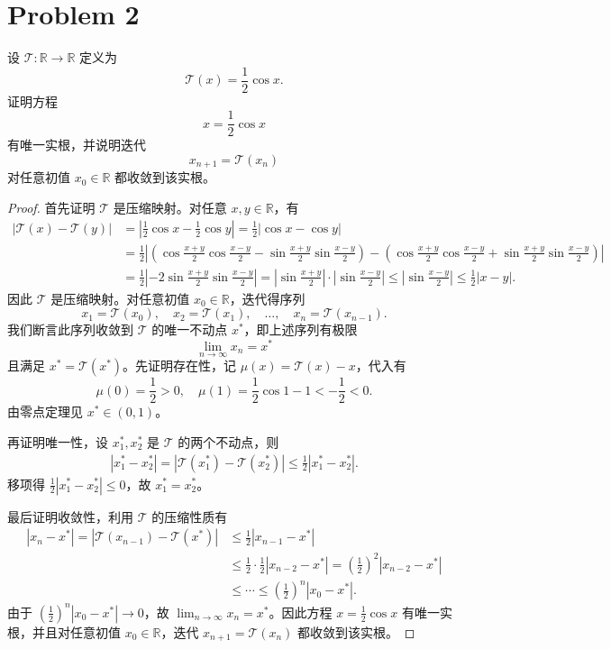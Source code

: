 \section*{Problem 2}

设 $\mathcal{T} : \mathbb{R} \to \mathbb{R}$ 定义为
\[
\mathcal{T}(x) = \frac12 \cos x.
\]
证明方程
\[
x = \frac12 \cos x
\]
有唯一实根，并说明迭代
\[
x_{n+1} = \mathcal{T}(x_n)
\]
对任意初值 $x_0 \in \mathbb{R}$ 都收敛到该实根。

\begin{proof}
首先证明 $\mathcal{T}$ 是压缩映射。对任意 $x, y \in \mathbb{R}$，有
\[
\begin{aligned}
|\mathcal{T}(x) - \mathcal{T}(y)| &= \left|\frac12 \cos x - \frac12 \cos y\right| = \frac12 |\cos x - \cos y| \\
&= \frac12 \left| {\left(\cos \frac{x + y}{2} \cos \frac{x - y}{2} - \sin \frac{x + y}{2} \sin \frac{x - y}{2}\right)- \left(\cos \frac{x + y}{2} \cos \frac{x - y}{2} + \sin \frac{x + y}{2} \sin \frac{x - y}{2}\right)}\right| \\
&= \frac12 \left| -2 \sin \frac{x + y}{2} \sin \frac{x - y}{2} \right| = \left|\sin \frac{x + y}{2}\right| \cdot \left|\sin \frac{x - y}{2}\right| \leq \left|\sin \frac{x - y}{2}\right| \leq \frac12 \left|x - y\right|.
\end{aligned}
\]
因此 $\mathcal{T}$ 是压缩映射。对任意初值 $x_0 \in \mathbb{R}$，迭代得序列
\[
x_1 = \mathcal{T}(x_0),\quad x_2 = \mathcal{T}(x_1),\quad \ldots, \quad x_n = \mathcal{T}(x_{n-1}).
\]
我们断言此序列收敛到 $\mathcal{T}$ 的唯一不动点 $x^*$，即上述序列有极限
\[
\lim_{n \to \infty} x_n = x^*
\]
且满足 $x^* = \mathcal{T}(x^*)$。先证明存在性，记 $\mu \left(x\right) = \mathcal{T} \left(x\right) - x$，代入有
\[
\mu \left(0\right) = \frac{1}{2} > 0, \quad \mu \left(1\right) = \frac{1}{2} \cos 1 - 1 < -\frac{1}{2} < 0.
\]
由零点定理见 $x^* \in \left(0, 1\right)$。

再证明唯一性，设 $x_1^*, x_2^*$ 是 $\mathcal{T}$ 的两个不动点，则
\[\begin{aligned}
|x_1^* - x_2^*| = |\mathcal{T}(x_1^*) - \mathcal{T}(x_2^*)| \leq \frac12 |x_1^* - x_2^*|.
\end{aligned}\]
移项得 $\frac12|x_1^*-x_2^*|\leq 0$，故 $x_1^* = x_2^*$。

最后证明收敛性，利用 $\mathcal{T}$ 的压缩性质有
\[
\begin{aligned}
    \left|x_n - x^*\right| = \left| \mathcal{T} \left(x_{n - 1}\right) - \mathcal{T} \left(x^*\right) \right| &\leq \frac12 \left|x_{n - 1} - x^*\right| \\
    &\leq \frac12 \cdot \frac12 \left|x_{n - 2} - x^*\right| = \left(\frac12\right)^2 \left|x_{n - 2} - x^*\right| \\
    &\leq \cdots \leq \left(\frac12\right)^{n} \left|x_0 - x^*\right|.
\end{aligned}
\]
由于 $\left(\frac12\right)^n|x_0-x^*|\to0$，故 $\lim_{n \to \infty} x_n = x^*$。因此方程 $x = \frac12 \cos x$ 有唯一实根，并且对任意初值 $x_0 \in \mathbb{R}$，迭代 $x_{n+1} = \mathcal{T}(x_n)$ 都收敛到该实根。


\end{proof}
